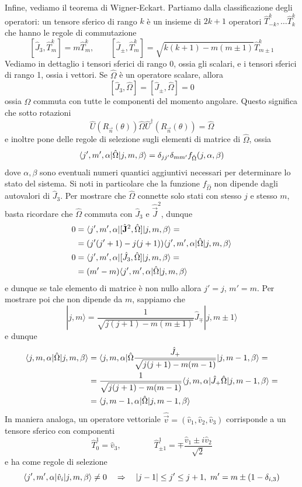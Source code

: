 \documentclass[a4paper, 11pt]{article}
\newcommand{\op}[1]{\hat{#1}}
\renewcommand{\op}[1]{\hat{#1}}
\renewcommand{\ket}[1]{| #1\rangle}
\begin{document}
Infine, vediamo il teorema di Wigner-Eckart. Partiamo dalla classificazione degli operatori: un tensore sferico di rango $k$ è un insieme di $2k+1$ operatori $\op T^k_{-k},\dots\op T^k_k$ che hanno le regole di commutazione
\begin{equation}\label{eq:tens1}[\op J_3,\op T^k_m]=m\op T^k_m,\qquad[\op J_\pm,\op T^k_m]=\sqrt{k(k+1)-m(m\pm 1)}\op T^k_{m\pm1}\end{equation}
Vediamo in dettaglio i tensori sferici di rango 0, ossia gli scalari, e i tensori sferici di rango 1, ossia i vettori. Se $\op{\Omega}$ è un operatore scalare, allora
\[[\op J_3,\op{\Omega}]=[\op J_\pm,\op{\Omega}]=0\]
ossia $\op{\Omega}$ commuta con tutte le componenti del momento angolare. Questo significa che sotto rotazioni
\[\op U(R_\vec{n}(\theta))\op{\Omega}\op U^\dagger(R_\vec{n}(\theta))=\op \Omega\]
e inoltre pone delle regole di selezione sugli elementi di matrice di $\op{\Omega}$, ossia
\[\braketop{j',m',\alpha}{\op{\Omega}}{j,m,\beta}=\delta_{jj'}\delta_{mm'}f_{\op{\Omega}}(j,\alpha,\beta)\]
dove $\alpha,\beta$ sono eventuali numeri quantici aggiuntivi necessari per determinare lo stato del sistema. Si noti in particolare che la funzione $f_{\op{\Omega}}$ non dipende dagli autovalori di $\op J_3$. Per mostrare che $\op{\Omega}$ connette solo stati con stesso $j$ e stesso $m$, basta ricordare che $\op{\Omega}$ commuta con $\op J_3$ e $\op{\vec{J}}^2$, dunque
\begin{align*}
	0&=\braketop{j',m',\alpha}{[\op{\vec{J}}^2,\op{\Omega}]}{j,m,\beta}=\\&=(j'(j'+1)-j(j+1))\braketop{j',m',\alpha}{\op{\Omega}}{j,m,\beta}\\0&=\braketop{j',m',\alpha}{[\op J_3,\op{\Omega}]}{j,m,\beta}=\\&=(m'-m)\braketop{j',m',\alpha}{\op{\Omega}}{j,m,\beta}
\end{align*} 
e dunque se tale elemento di matrice è non nullo allora $j'=j$, $m'=m$. Per mostrare poi che non dipende da $m$, sappiamo che
\[\ket{j,m}=\frac{1}{\sqrt{j(j+1)-m(m\pm 1)}}\op J_\mp\ket{j,m\pm1}\]
e dunque
\begin{align*}
	\braketop{j,m,\alpha}{\op{\Omega}}{j,m,\beta}&=\braketop{j,m,\alpha}{\op{\Omega}\frac{\op J_+}{\sqrt{j(j+1)-m(m-1)}}}{j,m-1,\beta}=\\&=\frac{1}{\sqrt{j(j+1)-m(m-1)}}\braketop{j,m,\alpha}{\op J_+\op{\Omega}}{j,m-1,\beta}=\\&=\braketop{j,m-1,\alpha}{\op{\Omega}}{j,m-1,\beta}
\end{align*}
In maniera analoga, un operatore vettoriale $\op{\vec{v}}=(\op v_1,\op v_2,\op v_3)$ corrisponde a un tensore sferico con componenti
\[\op T^1_0=\op v_3,\qquad\qquad\op T^{1}_{\pm 1}=\mp\frac{\op v_1\pm i\op v_2}{\sqrt{2}}\]
e ha come regole di selezione
\[\braketop{j',m',\alpha}{\op v_i}{j,m,\beta}\neq0\quad\Rightarrow\quad |j-1|\leq j'\leq j+1,\,\,m'=m\pm(1-\delta_{i,3})\]
\end{document}
